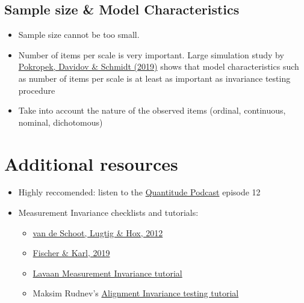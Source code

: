 \documentclass[
]{book}
\providecommand{\tightlist}{%
  \setlength{\itemsep}{0pt}\setlength{\parskip}{0pt}}
\begin{document}
\hypertarget{sample-size-model-characteristics}{%
\subsection{Sample size \& Model Characteristics}\label{sample-size-model-characteristics}}

\begin{itemize}
\item
  Sample size cannot be too small.
\item
  Number of items per scale is very important. Large simulation study by \href{https://www.tandfonline.com/doi/abs/10.1080/10705511.2018.1561293}{Pokropek, Davidov \& Schmidt (2019)} shows that model characteristics such as number of items per scale is at least as important as invariance testing procedure
\item
  Take into account the nature of the observed items (ordinal, continuous, nominal, dichotomous)
\end{itemize}

\hypertarget{additional-resources}{%
\section{Additional resources}\label{additional-resources}}

\begin{itemize}
\item
  Highly reccomended: listen to the \href{https://quantitudethepodcast.org/listen/}{Quantitude Podcast} episode 12
\item
  Measurement Invariance checklists and tutorials:

  \begin{itemize}
  \tightlist
  \item
    \href{https://www.tandfonline.com/doi/abs/10.1080/17405629.2012.686740}{van de Schoot, Lugtig \& Hox, 2012}
  \item
    \href{https://www.frontiersin.org/articles/10.3389/fpsyg.2019.01507/full}{Fischer \& Karl, 2019}
  \item
    \href{https://lavaan.ugent.be/tutorial/groups.html}{Lavaan Measurement Invariance tutorial}
  \item
    Maksim Rudnev's \href{https://maksimrudnev.com/2019/05/01/alignment-tutorial/}{Alignment Invariance testing tutorial}
  \end{itemize}
\end{itemize}

  
\end{document}
